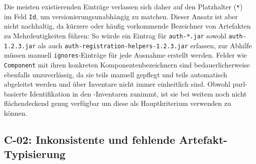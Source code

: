 Die meisten existierenden Einträge verlassen sich daher auf den Platzhalter (\texttt{*}) im Feld \texttt{Id}, um versionierungsunabhängig zu matchen.
Dieser Ansatz ist aber nicht nachhaltig, da kürzere oder häufig vorkommende Bezeichner von Artefakten zu Mehrdeutigkeiten führen:
So würde ein Eintrag für \texttt{auth-*.jar} sowohl \texttt{auth-1.2.3.jar} als auch \texttt{auth-registration-helpers-1.2.3.jar} erfassen, zur Abhilfe müssen manuell \texttt{ignores}-Einträge für jede Ausnahme erstellt werden.
Felder wie \texttt{Component} mit ihren konkreten Komponentenbezeichnern sind bedauerlicherweise ebenfalls unzuverlässig, da sie teils manuell gepflegt und teils automatisch abgeleitet werden und über Inventare nicht immer einheitlich sind.
Obwohl \acrshort{purl}-basierte Identifikation in den \metaeffekt-Inventaren zunimmt, ist sie bei weitem noch nicht flächendeckend genug verfügbar um diese als Hauptkriterium verwenden zu können.

\subsection{C-02: Inkonsistente und fehlende Artefakt-Typisierung}\label{subsec:c-02-uneindeutige-artefakt-typinformation}

%

